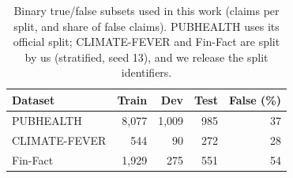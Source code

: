 \begin{table}[t]\centering\small\setlength{\tabcolsep}{4pt}
\begin{tabular}{lrrrr}
\toprule
Dataset & Train & Dev & Test & False (\%) \\
\midrule
PUBHEALTH & 8,077 & 1,009 & 985 & 37 \\
CLIMATE-FEVER & 544 & 90 & 272 & 28 \\
Fin-Fact & 1,929 & 275 & 551 & 54 \\
\bottomrule
\end{tabular}
\caption{Binary true/false subsets used in this work (claims per split, and share of false claims). PUBHEALTH uses its official split; CLIMATE-FEVER and Fin-Fact are split by us (stratified, seed 13), and we release the split identifiers.}
\label{tab:data}
\end{table}
